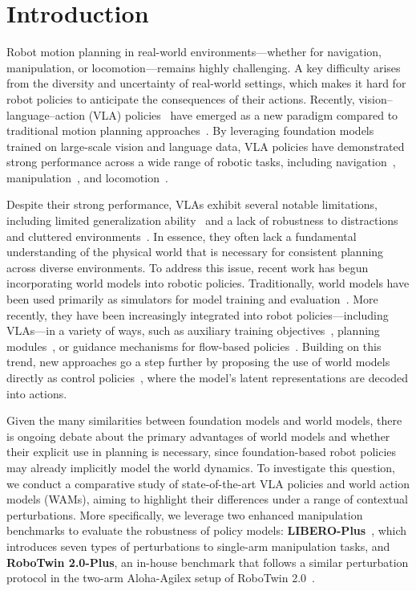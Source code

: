\documentclass{article}
\begin{document}
\section{Introduction}
Robot motion planning in real-world environments—whether for navigation, manipulation, or locomotion—remains highly challenging. A key difficulty arises from the diversity and uncertainty of real-world settings, which makes it hard for robot policies to anticipate the consequences of their actions. Recently, vision–language–action (VLA) policies~\citep{pi05,openvla2025} have emerged as a new paradigm compared to traditional motion planning approaches~\citep{elbanhawi2014sampling}. By leveraging foundation models trained on large-scale vision and language data, VLA policies have demonstrated strong performance across a wide range of robotic tasks, including navigation~\citep{xu2024mobility}, manipulation~\citep{zheng2026xvla}, and locomotion~\citep{jiang2026wholebodyvla}.

Despite their strong performance, VLAs exhibit several notable limitations, including limited generalization ability~\citep{ma2026generalvla} and a lack of robustness to distractions and cluttered environments~\citep{rasouli2025distracted}. In essence, they often lack a fundamental understanding of the physical world that is necessary for consistent planning across diverse environments. To address this issue, recent work has begun incorporating world models into robotic policies. Traditionally, world models have been used primarily as simulators for model training and evaluation~\citep{cutler2015real,ha2018_worldmodels,hafner2020_dreamer}. More recently, they have been increasingly integrated into robot policies—including VLAs—in a variety of ways, such as auxiliary training objectives~\citep{Chen_2025_ICCV,cen2025worldvla}, planning modules~\citep{yin2025womap,gao2025adaworld}, or guidance mechanisms for flow-based policies~\citep{du2025dynaguide,huang2025ladiwm,chen2026_hwm}. Building on this trend, new approaches go a step further by proposing the use of world models directly as control policies~\citep{kim2026cosmos,goswami2025osviwm, liao2025genie, li2026causal, ye2026dreamzero}, where the model’s latent representations are decoded into actions.
 
Given the many similarities between foundation models and world models, there is ongoing debate about the primary advantages of world models and whether their explicit use in planning is necessary, since foundation-based robot policies may already implicitly model the world dynamics. To investigate this question, we conduct a comparative study of state-of-the-art VLA policies and world action models (WAMs), aiming to highlight their differences under a range of contextual perturbations. More specifically, we leverage two enhanced manipulation benchmarks to evaluate the robustness of policy models: \textbf{LIBERO-Plus}~\citep{fei25libero-plus}, which introduces seven types of perturbations to single-arm manipulation tasks, and \textbf{RoboTwin 2.0-Plus}, an in-house benchmark that follows a similar perturbation protocol in the two-arm Aloha-Agilex setup of RoboTwin 2.0~\citep{chen2025robotwin}. 
\end{document}
